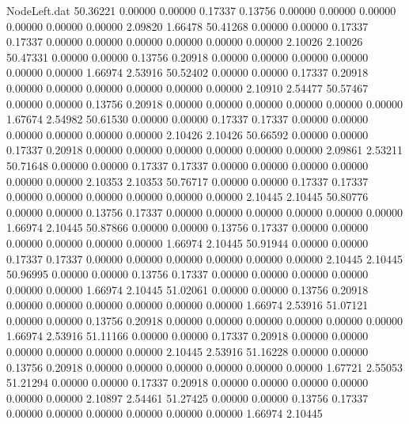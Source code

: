 \begin{filecontents}{NodeLeft.dat}
  50.36221    0.00000    0.00000     0.17337    0.13756    0.00000    0.00000    0.00000    0.00000    0.00000    0.00000    2.09820    1.66478
  50.41268    0.00000    0.00000     0.17337    0.17337    0.00000    0.00000    0.00000    0.00000    0.00000    0.00000    2.10026    2.10026
  50.47331    0.00000    0.00000     0.13756    0.20918    0.00000    0.00000    0.00000    0.00000    0.00000    0.00000    1.66974    2.53916
  50.52402    0.00000    0.00000     0.17337    0.20918    0.00000    0.00000    0.00000    0.00000    0.00000    0.00000    2.10910    2.54477
  50.57467    0.00000    0.00000     0.13756    0.20918    0.00000    0.00000    0.00000    0.00000    0.00000    0.00000    1.67674    2.54982
  50.61530    0.00000    0.00000     0.17337    0.17337    0.00000    0.00000    0.00000    0.00000    0.00000    0.00000    2.10426    2.10426
  50.66592    0.00000    0.00000     0.17337    0.20918    0.00000    0.00000    0.00000    0.00000    0.00000    0.00000    2.09861    2.53211
  50.71648    0.00000    0.00000     0.17337    0.17337    0.00000    0.00000    0.00000    0.00000    0.00000    0.00000    2.10353    2.10353
  50.76717    0.00000    0.00000     0.17337    0.17337    0.00000    0.00000    0.00000    0.00000    0.00000    0.00000    2.10445    2.10445
  50.80776    0.00000    0.00000     0.13756    0.17337    0.00000    0.00000    0.00000    0.00000    0.00000    0.00000    1.66974    2.10445
  50.87866    0.00000    0.00000     0.13756    0.17337    0.00000    0.00000    0.00000    0.00000    0.00000    0.00000    1.66974    2.10445
  50.91944    0.00000    0.00000     0.17337    0.17337    0.00000    0.00000    0.00000    0.00000    0.00000    0.00000    2.10445    2.10445
  50.96995    0.00000    0.00000     0.13756    0.17337    0.00000    0.00000    0.00000    0.00000    0.00000    0.00000    1.66974    2.10445
  51.02061    0.00000    0.00000     0.13756    0.20918    0.00000    0.00000    0.00000    0.00000    0.00000    0.00000    1.66974    2.53916
  51.07121    0.00000    0.00000     0.13756    0.20918    0.00000    0.00000    0.00000    0.00000    0.00000    0.00000    1.66974    2.53916
  51.11166    0.00000    0.00000     0.17337    0.20918    0.00000    0.00000    0.00000    0.00000    0.00000    0.00000    2.10445    2.53916
  51.16228    0.00000    0.00000     0.13756    0.20918    0.00000    0.00000    0.00000    0.00000    0.00000    0.00000    1.67721    2.55053
  51.21294    0.00000    0.00000     0.17337    0.20918    0.00000    0.00000    0.00000    0.00000    0.00000    0.00000    2.10897    2.54461
  51.27425    0.00000    0.00000     0.13756    0.17337    0.00000    0.00000    0.00000    0.00000    0.00000    0.00000    1.66974    2.10445

\end{filecontents}
